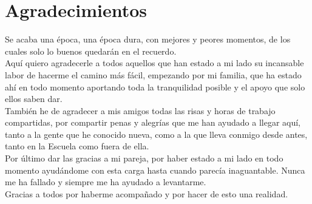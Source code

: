 \thispagestyle{empty}

\chapter*{Agradecimientos}

Se acaba una época, una época dura, con mejores y peores momentos, de los cuales solo lo buenos quedarán en el recuerdo.\\


Aquí quiero agradecerle a todos aquellos que han estado a mi lado su incansable labor de hacerme el camino más fácil, empezando por mi familia, que ha estado ahí en todo momento aportando toda la tranquilidad posible y el apoyo que solo ellos saben dar.\\


También he de agradecer a mis amigos todas las risas y horas de trabajo compartidas, por compartir penas y alegrías que me han ayudado a llegar aquí, tanto a la gente que he conocido nueva, como a la que lleva conmigo desde antes, tanto en la Escuela como fuera de ella.\\


Por último dar las gracias a mi pareja, por haber estado a mi lado en todo momento ayudándome con esta carga hasta cuando parecía inaguantable. Nunca me ha fallado y siempre me ha ayudado a levantarme.\\

Gracias a todos por haberme acompañado y por hacer de esto una realidad.